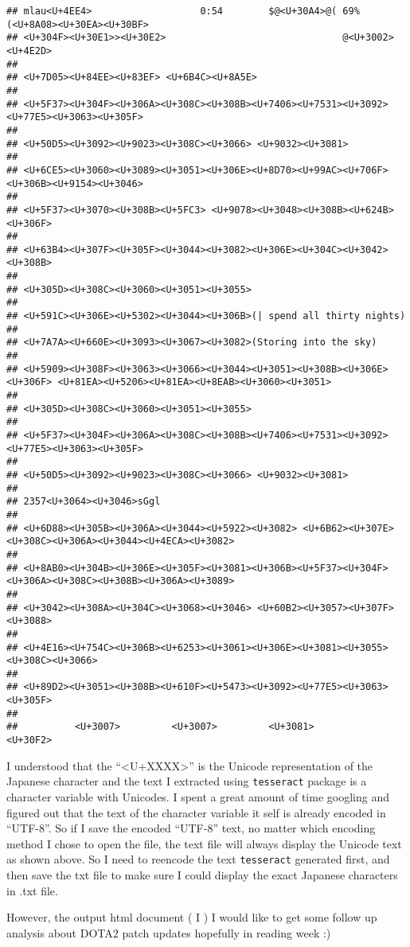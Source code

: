\documentclass[
]{article}
\begin{document}
\begin{verbatim}
## mlau<U+4EE4>                   0:54        $@<U+30A4>@( 69%(<U+8A08><U+30EA><U+30BF>
## <U+304F><U+30E1>><U+30E2>                               @<U+3002> <U+4E2D>
## 
## <U+7D05><U+84EE><U+83EF> <U+6B4C><U+8A5E>
## 
## <U+5F37><U+304F><U+306A><U+308C><U+308B><U+7406><U+7531><U+3092><U+77E5><U+3063><U+305F>
## 
## <U+50D5><U+3092><U+9023><U+308C><U+3066> <U+9032><U+3081>
## 
## <U+6CE5><U+3060><U+3089><U+3051><U+306E><U+8D70><U+99AC><U+706F><U+306B><U+9154><U+3046>
## 
## <U+5F37><U+3070><U+308B><U+5FC3> <U+9078><U+3048><U+308B><U+624B><U+306F>
## 
## <U+63B4><U+307F><U+305F><U+3044><U+3082><U+306E><U+304C><U+3042><U+308B>
## 
## <U+305D><U+308C><U+3060><U+3051><U+3055>
## 
## <U+591C><U+306E><U+5302><U+3044><U+306B>(| spend all thirty nights)
## 
## <U+7A7A><U+660E><U+3093><U+3067><U+3082>(Storing into the sky)
## 
## <U+5909><U+308F><U+3063><U+3066><U+3044><U+3051><U+308B><U+306E><U+306F> <U+81EA><U+5206><U+81EA><U+8EAB><U+3060><U+3051>
## 
## <U+305D><U+308C><U+3060><U+3051><U+3055>
## 
## <U+5F37><U+304F><U+306A><U+308C><U+308B><U+7406><U+7531><U+3092><U+77E5><U+3063><U+305F>
## 
## <U+50D5><U+3092><U+9023><U+308C><U+3066> <U+9032><U+3081>
## 
## 2357<U+3064><U+3046>sGgl
## 
## <U+6D88><U+305B><U+306A><U+3044><U+5922><U+3082> <U+6B62><U+307E><U+308C><U+306A><U+3044><U+4ECA><U+3082>
## 
## <U+8AB0><U+304B><U+306E><U+305F><U+3081><U+306B><U+5F37><U+304F><U+306A><U+308C><U+308B><U+306A><U+3089>
## 
## <U+3042><U+308A><U+304C><U+3068><U+3046> <U+60B2><U+3057><U+307F><U+3088>
## 
## <U+4E16><U+754C><U+306B><U+6253><U+3061><U+306E><U+3081><U+3055><U+308C><U+3066>
## 
## <U+89D2><U+3051><U+308B><U+610F><U+5473><U+3092><U+77E5><U+3063><U+305F>
## 
##          <U+3007>         <U+3007>         <U+3081>         <U+30F2>
\end{verbatim}

I understood that the ``\textless U+XXXX\textgreater{}'' is the Unicode
representation of the Japanese character and the text I extracted using
\texttt{tesseract} package is a character variable with Unicodes. I
spent a great amount of time googling and figured out that the text of
the character variable it self is already encoded in ``UTF-8''. So if I
save the encoded ``UTF-8'' text, no matter which encoding method I chose
to open the file, the text file will always display the Unicode text as
shown above. So I need to reencode the text \texttt{tesseract} generated
first, and then save the txt file to make sure I could display the exact
Japanese characters in .txt file.

However, the output html document ( I ) I would like to get some follow
up analysis about DOTA2 patch updates hopefully in reading week :)
\end{document}
